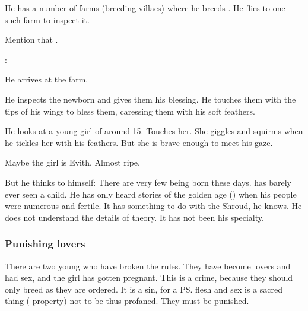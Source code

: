 He has a number of farms (breeding villaes) where he breeds \humans. 
He flies to one such farm to inspect it. 

Mention that . 

\begin{prose}
\Teshrial: 
\end{prose}

He arrives at the farm. 

He inspects the newborn and gives them his blessing. 
He touches them with the tips of his wings to bless them, caressing them with his soft feathers. 

He looks at a young girl of around 15. 
Touches her. 
She giggles and squirms when he tickles her with his feathers. 
But she is brave enough to meet his gaze. 


Maybe the girl is Evith. 
Almost ripe. 


But he thinks to himself: 
There are very few \resphain{} being born these days. 
\Teshrial{} has barely ever seen a \resphan{} child. 
He has only heard stories of the golden age () when his people were numerous and fertile. 
It has something to do with the Shroud, he knows. 
He does not understand the details of \dweomer{} theory. 
It has not been his specialty. 







\subsubsection{Punishing lovers}
There are two young \humans{} who have broken the rules. 
They have become lovers and had sex, and the girl has gotten pregnant. 
This is a crime, because they should only breed as they are ordered. 
It is a sin, for a \ps{\human} flesh and sex is a sacred thing (\resphan{} property) not to be thus profaned. 
They must be punished. 

